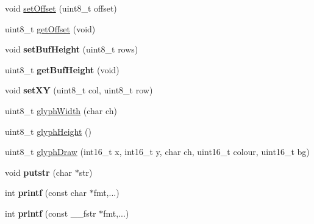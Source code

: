 \begin{DoxyCompactItemize}
\item 
void \hyperlink{class_oled_m_p_a3c2f056e15eebc7ed251d2063b9ea548}{set\-Offset} (uint8\-\_\-t offset)
\item 
uint8\-\_\-t \hyperlink{class_oled_m_p_a21f3e0429d9d1e3b3b35e14c43a2cc14}{get\-Offset} (void)
\item 
\hypertarget{class_oled_m_p_a1536d8b4e6dc717bbb136e0ea9d2f153}{void {\bfseries set\-Buf\-Height} (uint8\-\_\-t rows)}\label{class_oled_m_p_a1536d8b4e6dc717bbb136e0ea9d2f153}

\item 
\hypertarget{class_oled_m_p_a06cc11528c85c48902d331d44c7afd86}{uint8\-\_\-t {\bfseries get\-Buf\-Height} (void)}\label{class_oled_m_p_a06cc11528c85c48902d331d44c7afd86}

\item 
\hypertarget{class_oled_m_p_aa8c53db9152479c10b06f570eec26b72}{void {\bfseries set\-X\-Y} (uint8\-\_\-t col, uint8\-\_\-t row)}\label{class_oled_m_p_aa8c53db9152479c10b06f570eec26b72}

\item 
uint8\-\_\-t \hyperlink{class_oled_m_p_aecffe0ea3966e0b8f68d513fa056f766}{glyph\-Width} (char ch)
\item 
uint8\-\_\-t \hyperlink{class_oled_m_p_a0f6a30b9ad24c745c65b3928f277b368}{glyph\-Height} ()
\item 
uint8\-\_\-t \hyperlink{class_oled_m_p_a5af45cadc3caefdfa23793b65da9e6bd}{glyph\-Draw} (int16\-\_\-t x, int16\-\_\-t y, char ch, uint16\-\_\-t colour, uint16\-\_\-t bg)
\item 
\hypertarget{class_oled_m_p_aa29c51ab6873e2a10328425becb4d3c0}{void {\bfseries putstr} (char $\ast$str)}\label{class_oled_m_p_aa29c51ab6873e2a10328425becb4d3c0}

\item 
\hypertarget{class_oled_m_p_a55f3d956bb2ba20b5059e9e25484a47f}{int {\bfseries printf} (const char $\ast$fmt,...)}\label{class_oled_m_p_a55f3d956bb2ba20b5059e9e25484a47f}

\item 
\hypertarget{class_oled_m_p_a1675bc561e97e62b320138568c1f9019}{int {\bfseries printf} (const \-\_\-\-\_\-fstr $\ast$fmt,...)}\label{class_oled_m_p_a1675bc561e97e62b320138568c1f9019}

\end{DoxyCompactItemize}
